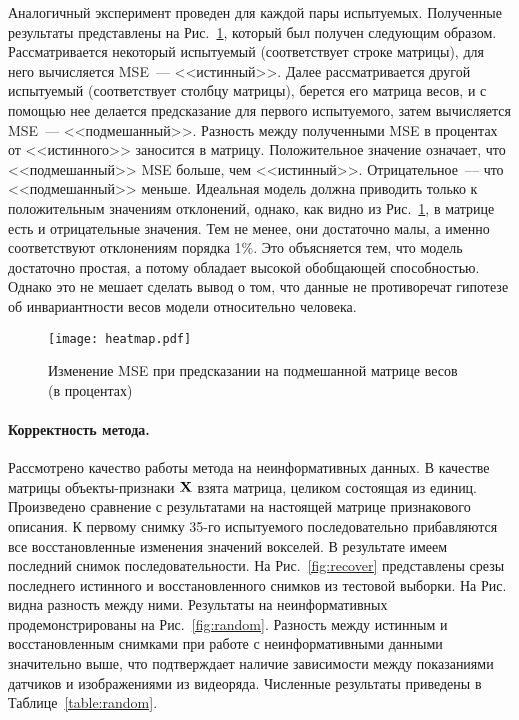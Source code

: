 \documentclass[a4paper, 12pt]{extarticle}
\begin{document}
Аналогичный эксперимент проведен для каждой пары испытуемых.
Полученные результаты представлены на Рис.~\ref{fig:heatmap},
который был получен следующим образом.
Рассматривается некоторый испытуемый (соответствует строке матрицы), 
для него вычисляется MSE~--- <<истинный>>.
Далее рассматривается другой испытуемый (соответствует столбцу матрицы),
берется его матрица весов, и с помощью нее делается предсказание для первого 
испытуемого, затем вычисляется MSE~--- <<подмешанный>>. 
Разность между полученными MSE в процентах от <<истинного>> заносится в матрицу.
Положительное значение означает, что <<подмешанный>> MSE больше, чем <<истинный>>.
Отрицательное~--- что <<подмешанный>> меньше.
Идеальная модель должна приводить только к положительным значениям отклонений, однако,
как видно из Рис.~\ref{fig:heatmap}, в матрице есть и отрицательные значения.
Тем не менее, они достаточно малы, а именно соответствуют отклонениям порядка 1\%.
Это объясняется тем, что модель достаточно простая, а потому обладает
высокой обобщающей способностью.
Однако это не мешает сделать вывод о том, что данные не противоречат гипотезе 
об инвариантности весов модели относительно человека.

\begin{figure}[h!]
	\centering
	\texttt{[image: heatmap.pdf]}
	\caption{Изменение MSE при предсказании на подмешанной матрице весов (в процентах)}
	\label{fig:heatmap}
\end{figure}

\paragraph*{Корректность метода.}

Рассмотрено качество работы метода на неинформативных данных.
В качестве матрицы объекты-признаки $\mathbf{X}$ взята матрица, целиком состоящая из единиц.
Произведено сравнение с результатами на настоящей матрице признакового описания.
К первому снимку 35-го испытуемого последовательно прибавляются все восстановленные
изменения значений вокселей.
В результате имеем последний снимок последовательности. На Рис.~\ref*{fig:recover}
представлены срезы последнего истинного и восстановленного снимков из тестовой выборки.
На Рис. видна разность между ними.
Результаты на неинформативных продемонстрированы на Рис.~\ref*{fig:random}.
Разность между истинным и восстановленным снимками при работе с неинформативными данными
значительно выше, что подтверждает наличие зависимости между показаниями датчиков и
изображениями из видеоряда. Численные результаты приведены в Таблице~\ref{table:random}.
\end{document}

